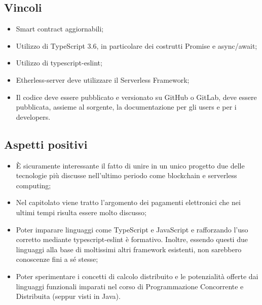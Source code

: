\subsection{Vincoli}
\begin{itemize}
\item Smart contract aggiornabili;
\item Utilizzo di TypeScript 3.6, in particolare dei costrutti Promise e async/await;
\item Utilizzo di typescript-eslint;
\item Etherless-server deve utilizzare il Serverless Framework;
\item Il codice deve essere pubblicato e versionato su GitHub o GitLab, deve essere pubblicata, assieme al sorgente, la documentazione per gli users e per i developers.
\end{itemize}

\subsection{Aspetti positivi}
\begin{itemize}
\item \`E sicuramente interessante il fatto di unire in un unico progetto due delle tecnologie pi\`u discusse nell'ultimo periodo come blockchain e serverless computing;
\item Nel capitolato viene tratto l'argomento dei pagamenti elettronici che nei ultimi tempi risulta essere molto discusso;
\item Poter imparare linguaggi come TypeScript e JavaScript e rafforzando l'uso corretto mediante typescript-eslint \`e formativo. Inoltre, essendo questi due linguaggi alla base di moltissimi altri framework esistenti, non sarebbero conoscenze fini a s\'e stesse;
\item Poter sperimentare i concetti di calcolo distribuito e le potenzialit\`a offerte dai linguaggi funzionali imparati nel corso di Programmazione Concorrente e Distribuita (seppur visti in Java).
\end{itemize}

